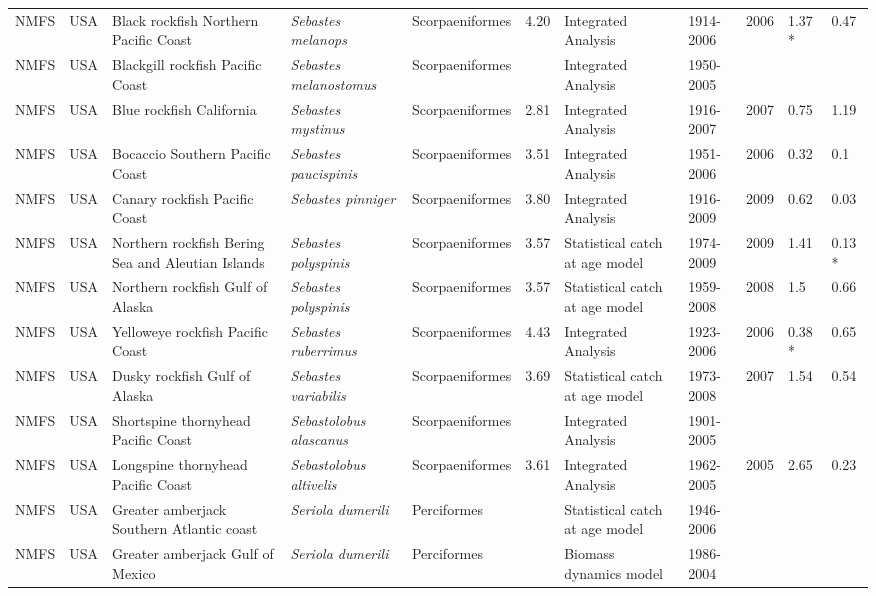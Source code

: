 \begin{longtable}{p{1.5cm}p{1.5cm}p{3cm}p{3cm}p{2.5cm}p{0.9cm}p{1.4cm}p{0.9cm}p{0.9cm}p{0.9cm}p{1cm}}
  NMFS & USA & Black rockfish Northern Pacific Coast & \textit{Sebastes melanops} & Scorpaeniformes & 4.20 & Integrated Analysis & 1914-2006 & 2006 & 1.37 * & 0.47 \\ 
  NMFS & USA & Blackgill rockfish  Pacific Coast & \textit{Sebastes melanostomus} & Scorpaeniformes &  & Integrated Analysis & 1950-2005 &  &  &  \\ 
  NMFS & USA & Blue rockfish California & \textit{Sebastes mystinus} & Scorpaeniformes & 2.81 & Integrated Analysis & 1916-2007 & 2007 & 0.75 & 1.19 \\ 
  NMFS & USA & Bocaccio Southern Pacific Coast & \textit{Sebastes paucispinis} & Scorpaeniformes & 3.51 & Integrated Analysis & 1951-2006 & 2006 & 0.32 & 0.1 \\ 
  NMFS & USA & Canary rockfish Pacific Coast & \textit{Sebastes pinniger} & Scorpaeniformes & 3.80 & Integrated Analysis & 1916-2009 & 2009 & 0.62 & 0.03 \\ 
  NMFS & USA & Northern rockfish Bering Sea and Aleutian Islands & \textit{Sebastes polyspinis} & Scorpaeniformes & 3.57 & Statistical catch at age model & 1974-2009 & 2009 & 1.41 & 0.13 * \\ 
  NMFS & USA & Northern rockfish Gulf of Alaska & \textit{Sebastes polyspinis} & Scorpaeniformes & 3.57 & Statistical catch at age model & 1959-2008 & 2008 & 1.5 & 0.66 \\ 
  NMFS & USA & Yelloweye rockfish Pacific Coast & \textit{Sebastes ruberrimus} & Scorpaeniformes & 4.43 & Integrated Analysis & 1923-2006 & 2006 & 0.38 * & 0.65 \\ 
  NMFS & USA & Dusky rockfish Gulf of Alaska & \textit{Sebastes variabilis} & Scorpaeniformes & 3.69 & Statistical catch at age model & 1973-2008 & 2007 & 1.54 & 0.54 \\ 
  NMFS & USA & Shortspine thornyhead Pacific Coast & \textit{Sebastolobus alascanus} & Scorpaeniformes &  & Integrated Analysis & 1901-2005 &  &  &  \\ 
  NMFS & USA & Longspine thornyhead Pacific Coast & \textit{Sebastolobus altivelis} & Scorpaeniformes & 3.61 & Integrated Analysis & 1962-2005 & 2005 & 2.65 & 0.23 \\ 
  NMFS & USA & Greater amberjack Southern Atlantic coast & \textit{Seriola dumerili} & Perciformes &  & Statistical catch at age model & 1946-2006 &  &  &  \\ 
  NMFS & USA & Greater amberjack Gulf of Mexico & \textit{Seriola dumerili} & Perciformes &  & Biomass dynamics model & 1986-2004 &  &  &  \\ 

\end{longtable}
